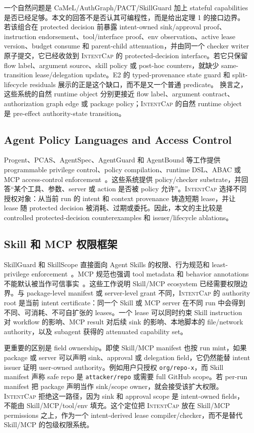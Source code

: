 \documentclass[UTF8,a4paper,11pt]{ctexart}
\newcommand{\sys}{\textsc{IntentCap}\xspace}
\begin{document}
一个自然问题是 CaMeL/AuthGraph/PACT/SkillGuard 加上 stateful capabilities 是否已经足够。本文的回答不是否认其可编程性，而是给出定理 1 的接口边界。若该组合在 protected decision 前暴露 intent-owned sink/approval proof、instruction endorsement、tool/interface proof、env observation、active lease version、budget consume 和 parent-child attenuation，并由同一个 checker writer 原子提交，它已经收敛到 \sys 的 protected-decision interface。若它只保留 flow label、argument source、skill policy 或 post-hoc counters，就缺少 same-transition lease/delegation update。E2 的 typed-provenance state guard 和 split-lifecycle residuals 展示的正是这个缺口，而不是又一个普通 predicate。
换言之，这些系统的自然 runtime object 分别更接近 flow label、argument contract、authorization graph edge 或 package policy；\sys 的自然 runtime object 是 pre-effect authority-state transition。

\subsection{Agent Policy Languages and Access Control}
Progent、PCAS、AgentSpec、AgentGuard 和 AgentBound 等工作提供 programmable privilege control、policy compilation、runtime DSL、ABAC 或 MCP access-control enforcement~\cite{progent,pcas,agentspec,agentguard,agentbound}。这些系统提供 policy/checker substrate，并回答“某个工具、参数、server 或 action 是否被 policy 允许”。\sys 选择不同授权对象：从当前 run 的 intent 和 context provenance 铸造短期 lease，并让 lease 随 protected decision 被消耗、过期或委托。因此，本文的主比较是 controlled protected-decision counterexamples 和 issuer/lifecycle ablations。

\subsection{Skill 和 MCP 权限框架}
SkillGuard 和 SkillScope 直接面向 Agent Skills 的权限、行为规范和 least-privilege enforcement~\cite{skillguard,skillscope}。MCP 规范也强调 tool metadata 和 behavior annotations 不能默认被当作可信事实~\cite{mcp-spec}。这些工作说明 Skill/MCP ecosystem 已经需要权限边界。与 package-level manifest 或 server-level grant 不同，\sys 的 authority root 是当前 intent certificate：同一个 Skill 或 MCP server 在不同 run 中会得到不同、可消耗、不可自扩张的 leases。一个 lease 可以同时约束 Skill instruction 对 workflow 的影响、MCP result 对后续 sink 的影响、本地脚本的 file/network authority，以及 subagent 获得的 attenuated capability set。

更重要的区别是 field ownership。即使 Skill/MCP manifest 也按 run mint，如果 package 或 server 可以声明 sink、approval 或 delegation field，它仍然能替 intent issuer 证明 user-owned authority。例如用户只授权 \texttt{org/repo-x}，而 Skill manifest 声称 safe repo 是 \texttt{attacker/repo} 或需要 full GitHub scope。若 per-run manifest 把 package 声明当作 sink/scope owner，就会接受该扩大权限。\sys 拒绝这一路径，因为 sink 和 approval scope 是 intent-owned fields，不能由 Skill/MCP/tool/env 填充。这个定位把 \sys 放在 Skill/MCP permissions 之上，作为一个 intent-derived lease compiler/checker，而不是替代 Skill/MCP 的包级权限系统。
\end{document}
